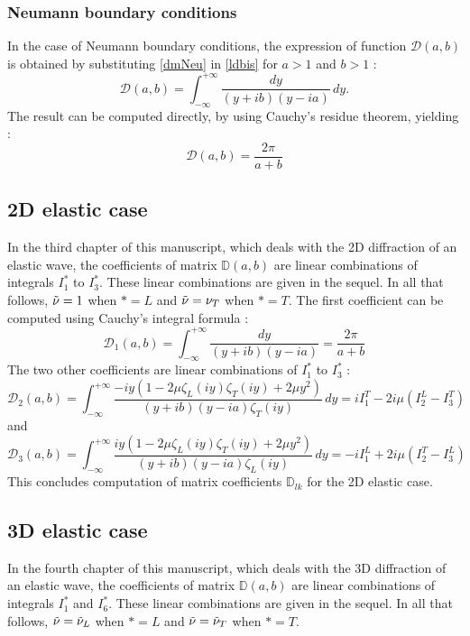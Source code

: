 \subsubsection{Neumann boundary conditions}
\label{finalDacNeu}
In the case of Neumann boundary conditions, the expression of function $\mathcal{D}(a,b)$ is obtained by substituting \eqref{dmNeu} in \eqref{ldbis} for $a>1$ and $b>1$ :
\begin{equation}
\mathcal{D}(a,b) = \int_{-\infty}^{+\infty} \dfrac{dy}{ (y+ib)(y-ia)} \, dy .
\end{equation}
The result can be computed directly, by using Cauchy's residue theorem, yielding :
\begin{equation}
\mathcal{D}(a,b)=\dfrac{2\pi}{a+b}
\end{equation}

\subsection{2D elastic case}
In the third chapter of this manuscript, which deals with the 2D diffraction of an elastic wave, the coefficients of matrix $\mathbb{D}(a,b)$ are linear combinations of integrals $I_1^*$ to $I_3^*$. These linear combinations are given in the sequel. In all that follows, $\tilde{\nu}=1$ when $*=L$ and $\tilde{\nu}=\nu_T$ when $*=T$.
\label{finalD2D}
The first coefficient can be computed using Cauchy's integral formula :
\begin{equation}
\mathcal{D}_1(a,b)=\int_{-\infty}^{+\infty} \frac{dy}{(y+ib)(y-ia)}=\frac{2\pi}{a+b}
\end{equation}
The two other coefficients are linear combinations of $I_1^*$ to $I_3^*$ :
\begin{equation}
\mathcal{D}_2(a,b)=\int_{-\infty}^{+\infty} \frac{-iy(1-2\mu \zeta_L(iy) \zeta_T(iy)+2\mu y^2)}{(y+ib)(y-ia)\zeta_T(iy)} \,dy =i I_1^T-2i\mu(I_2^L-I_3^T)
\label{D2}
\end{equation}
and
\begin{equation}
\mathcal{D}_3(a,b)=\int_{-\infty}^{+\infty} \frac{iy(1-2\mu \zeta_L(iy) \zeta_T(iy)+2\mu y^2)}{(y+ib)(y-ia)\zeta_L(iy)} \,dy=-iI_1^L+2i\mu(I_2^T-I_3^L)
\label{D3}
\end{equation}
This concludes computation of matrix coefficients $\mathbb{D}_{lk}$ for the 2D elastic case.

\subsection{3D elastic case}
\label{finalD3D}
In the fourth chapter of this manuscript, which deals with the 3D diffraction of an elastic wave, the coefficients of matrix $\mathbb{D}(a,b)$ are linear combinations of integrals $I_1^*$ and $I_6^*$. These linear combinations are given in the sequel. In all that follows, $\tilde{\nu}=\tilde{\nu}_L$ when $*=L$ and $\tilde{\nu}=\tilde{\nu}_T$ when $*=T$.

